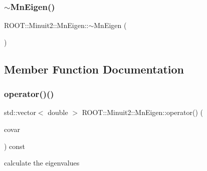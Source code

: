 \mbox{\label{classROOT_1_1Minuit2_1_1MnEigen_a1c3b3cbc2976616c779f394121798093}} 
\subsubsection{\texorpdfstring{$\sim$MnEigen()}{~MnEigen()}\hspace{0.1cm}{\footnotesize\ttfamily [2/2]}}
{\footnotesize\ttfamily R\+O\+O\+T\+::\+Minuit2\+::\+Mn\+Eigen\+::$\sim$\+Mn\+Eigen (\begin{DoxyParamCaption}{ }\end{DoxyParamCaption})\hspace{0.3cm}{\ttfamily [inline]}}



\subsection{Member Function Documentation}
\mbox{\label{classROOT_1_1Minuit2_1_1MnEigen_aba6999f348c2cbc8055528faf207b7d6}} 
\subsubsection{\texorpdfstring{operator()()}{operator()()}\hspace{0.1cm}{\footnotesize\ttfamily [1/2]}}
{\footnotesize\ttfamily std\+::vector$<$ double $>$ R\+O\+O\+T\+::\+Minuit2\+::\+Mn\+Eigen\+::operator() (\begin{DoxyParamCaption}\item[{const \mbox{\hyperlink{classROOT_1_1Minuit2_1_1MnUserCovariance}{Mn\+User\+Covariance}} \&}]{covar }\end{DoxyParamCaption}) const}



calculate the eigenvalues 

